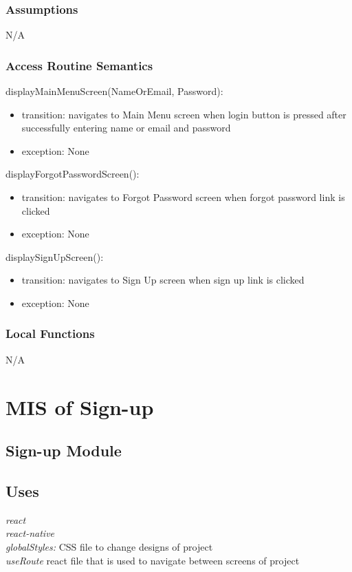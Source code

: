 \documentclass[12pt, titlepage]{article}
\begin{document}
\subsubsection{Assumptions}

N/A

\subsubsection{Access Routine Semantics}

\noindent displayMainMenuScreen(NameOrEmail, Password):
\begin{itemize}
	\item transition: navigates to Main Menu screen when login button is pressed after successfully entering name or email and password 
	\item exception: None 
\end{itemize}

\noindent displayForgotPasswordScreen():
\begin{itemize}
	\item transition: navigates to Forgot Password screen when forgot password link is clicked 
	\item exception: None 
\end{itemize}

\noindent displaySignUpScreen():
\begin{itemize}
	\item transition: navigates to Sign Up screen when sign up link is clicked 
	\item exception: None 
\end{itemize}

\subsubsection{Local Functions}
N/A

\section{MIS of Sign-up} \label{Module} 
\subsection{Sign-up Module}

\subsection{Uses}
{\textit{react}}\\
{\textit{react-native}}\\
{\textit{globalStyles:} CSS file to change designs of project}\\
{\textit{useRoute} react file that is used to navigate between screens of project}
\end{document}
